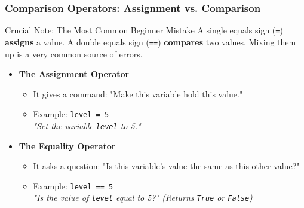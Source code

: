 \documentclass{beamer}
\begin{document}
\begin{frame}[fragile]
    \frametitle{Comparison Operators: Assignment vs. Comparison}
    
    \begin{block}{Crucial Note: The Most Common Beginner Mistake}
    A single equals sign (\texttt{=}) \textbf{assigns} a value. A double equals sign (\texttt{==}) \textbf{compares} two values. Mixing them up is a very common source of errors.
    \end{block}
    
    \vspace{1em}
    
    \begin{itemize}
        \item[\texttt{=}] \textbf{The Assignment Operator}
        \begin{itemize}
            \item It gives a command: "Make this variable hold this value."
            \item Example: \texttt{level = 5} \\ \textit{"Set the variable \texttt{level} to 5."}
        \end{itemize}
        
        \vspace{1em}
        
        \item[\texttt{==}] \textbf{The Equality Operator}
        \begin{itemize}
            \item It asks a question: "Is this variable's value the same as this other value?"
            \item Example: \texttt{level == 5} \\ \textit{"Is the value of \texttt{level} equal to 5?" (Returns \texttt{True} or \texttt{False})}
        \end{itemize}
    \end{itemize}
    
    \vfill
\end{frame}
\end{document}
